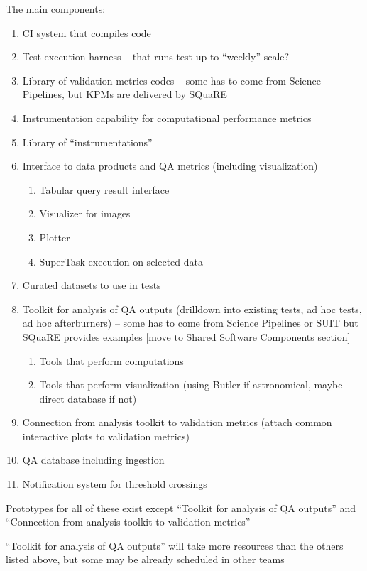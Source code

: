 The main components:
\begin{enumerate}
\item CI system that compiles code
\item Test execution harness – that runs test up to “weekly” scale?
\item Library of validation metrics codes – some has to come from Science Pipelines, but KPMs are delivered by SQuaRE
\item Instrumentation capability for computational performance metrics
\item Library of “instrumentations”
\item Interface to data products and QA metrics (including visualization)
    \begin{enumerate}
    \item Tabular query result interface
    \item Visualizer for images
    \item Plotter
    \item SuperTask execution on selected data
    \end{enumerate}
\item Curated datasets to use in tests
\item Toolkit for analysis of QA outputs (drilldown into existing tests, ad hoc tests, ad hoc afterburners) – some has to come from Science Pipelines or SUIT but SQuaRE provides examples [move to Shared Software Components section]
    \begin{enumerate}
    \item Tools that perform computations
    \item Tools that perform visualization (using Butler if astronomical, maybe direct database if not)
    \end{enumerate}
\item Connection from analysis toolkit to validation metrics (attach common interactive plots to validation metrics)
\item QA database including ingestion
\item Notification system for threshold crossings
\end{enumerate}

Prototypes for all of these exist except ``Toolkit for analysis of QA outputs'' and ``Connection from analysis toolkit to validation metrics''

``Toolkit for analysis of QA outputs'' will take more resources than the others listed above, but some may be already scheduled in other teams

